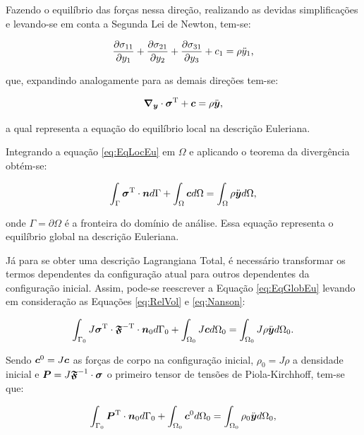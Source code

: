 Fazendo o equilíbrio das forças nessa direção, realizando as devidas simplificações e levando-se em conta a Segunda Lei de Newton, tem-se:

\[\frac{\partial{\sigma_{11}}}{\partial{y_1}}+\frac{\partial{\sigma_{21}}}{\partial{y_2}}+\frac{\partial{\sigma_{31}}}{\partial{y_3}}+c_1=\rho\ddot{y}_1\text{,}\]

\noindent que, expandindo analogamente para as demais direções tem-se:

\begin{equation}
    \boldsymbol{\nabla_y}\cdot\boldsymbol{\sigma}^\mathrm{T}+\boldsymbol{c}=\rho\ddot{\boldsymbol{y}}\text{,}
    \label{eq:EqLocEu}
\end{equation}

\noindent a qual representa a equação do equilíbrio local  na descrição Euleriana.

Integrando a equação \eqref{eq:EqLocEu} em $\Omega$ e aplicando o teorema da divergência obtém-se:

\begin{equation}
    \int_\Gamma{\boldsymbol{\sigma}^\mathrm{T}\cdot\boldsymbol{n}d\Gamma}+\int_\Omega{\boldsymbol{c}d\Omega}=\int_\Omega{\rho\ddot{\boldsymbol{y}}d\Omega}
    \text{,}
    \label{eq:EqGlobEu}
\end{equation}

\noindent onde $\Gamma=\partial\Omega$ é a fronteira do domínio de análise. Essa equação representa o equilíbrio global na descrição Euleriana.

Já para se obter uma descrição Lagrangiana Total, é necessário transformar os termos dependentes da configuração atual para outros dependentes da configuração inicial. Assim, pode-se reescrever a Equação \eqref{eq:EqGlobEu} levando em consideração as Equações \eqref{eq:RelVol} e \eqref{eq:Nanson}:

\begin{equation}
    \int_{\Gamma_0}{J\boldsymbol{\sigma}^\mathrm{T}\cdot\boldsymbol{\mathfrak{F}}^\mathrm{-T}\cdot\boldsymbol{n}_0d\Gamma_0}+\int_{\Omega_0}{J\boldsymbol{c}d\Omega_0}=\int_{\Omega_0}{J\rho\ddot{\boldsymbol{y}}d\Omega_0}
    \text{.}
\end{equation}

\noindent Sendo $\boldsymbol{c}^0=J\boldsymbol{c}$ as forças de corpo na configuração inicial, $\rho_0=J\rho$ a densidade inicial e $\boldsymbol{P}=J\boldsymbol{\mathfrak{F}}^{-1}\cdot\boldsymbol{\sigma}$ o primeiro tensor de tensões de Piola-Kirchhoff, tem-se que:

\begin{equation}
    \int_{\Gamma_0}{\boldsymbol{P}^\mathrm{T}\cdot\boldsymbol{n}_0d\Gamma_0}+\int_{\Omega_0}{\boldsymbol{c}^0d\Omega_0}=\int_{\Omega_0}{\rho_0\ddot{\boldsymbol{y}}d\Omega_0}\text{,}
\end{equation}

